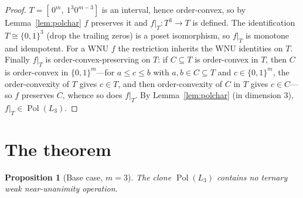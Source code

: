 \documentclass[11pt]{amsart}
\theoremstyle{plain}
\newtheorem{prop}[thm]{Proposition}
\theoremstyle{definition}
\DeclareMathOperator{\Pol}{Pol}
\newcommand{\B}{\{0,1\}}
\begin{document}
\begin{proof}
  $T=[\,0^m,\ 1^3 0^{m-3}]$ is an interval, hence order-convex, so by
  Lemma~\ref{lem:polchar} $f$ preserves it and $f|_T\colon T^3\to T$ is
  defined.  The identification $T\cong\B^3$ (drop the trailing zeros)
  is a poset isomorphism, so $f|_T$ is monotone and idempotent.  For a
  WNU $f$ the restriction inherits the WNU identities on $T$.  Finally
  $f|_T$ is order-convex-preserving on $T$: if $C\subseteq T$ is
  order-convex in $T$, then $C$ is order-convex in $\B^m$---for
  $a\le c\le b$ with $a,b\in C\subseteq T$ and $c\in\B^m$, the
  order-convexity of $T$ gives $c\in T$, and then order-convexity of
  $C$ in $T$ gives $c\in C$---so $f$ preserves $C$, whence so does
  $f|_T$.  By Lemma~\ref{lem:polchar} (in dimension $3$), $f|_T\in
  \Pol(L_3)$.
\end{proof}

\section{The theorem}

\begin{prop}[Base case, $m=3$]\label{prop:base}
  The clone $\Pol(L_3)$ contains no ternary weak near-unanimity
  operation.
\end{prop}
\end{document}
